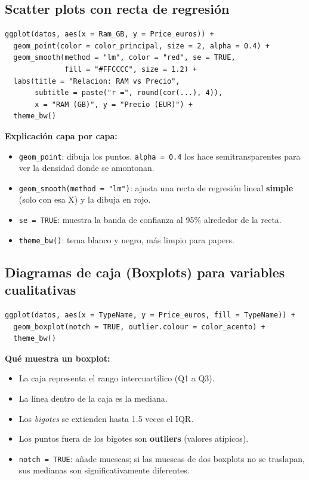 \documentclass[12pt,a4paper]{article}
\begin{document}
\subsection{Scatter plots con recta de regresión}

\begin{lstlisting}[caption={Scatter plot RAM vs Precio}]
ggplot(datos, aes(x = Ram_GB, y = Price_euros)) +
  geom_point(color = color_principal, size = 2, alpha = 0.4) +
  geom_smooth(method = "lm", color = "red", se = TRUE, 
              fill = "#FFCCCC", size = 1.2) +
  labs(title = "Relacion: RAM vs Precio",
       subtitle = paste("r =", round(cor(...), 4)),
       x = "RAM (GB)", y = "Precio (EUR)") +
  theme_bw()
\end{lstlisting}

\textbf{Explicación capa por capa:}
\begin{itemize}
    \item \texttt{geom\_point}: dibuja los puntos. \texttt{alpha = 0.4} los hace semitransparentes para ver la densidad donde se amontonan.
    \item \texttt{geom\_smooth(method = "lm")}: ajusta una recta de regresión lineal \textbf{simple} (solo con esa X) y la dibuja en rojo.
    \item \texttt{se = TRUE}: muestra la banda de confianza al 95\% alrededor de la recta.
    \item \texttt{theme\_bw()}: tema blanco y negro, más limpio para papers.
\end{itemize}

\subsection{Diagramas de caja (Boxplots) para variables cualitativas}

\begin{lstlisting}[caption={Boxplot Tipo de Laptop vs Precio}]
ggplot(datos, aes(x = TypeName, y = Price_euros, fill = TypeName)) +
  geom_boxplot(notch = TRUE, outlier.colour = color_acento) +
  theme_bw()
\end{lstlisting}

\textbf{Qué muestra un boxplot:}
\begin{itemize}
    \item La caja representa el rango intercuartílico (Q1 a Q3).
    \item La línea dentro de la caja es la mediana.
    \item Los \textit{bigotes} se extienden hasta 1.5 veces el IQR.
    \item Los puntos fuera de los bigotes son \textbf{outliers} (valores atípicos).
    \item \texttt{notch = TRUE}: añade muescas; si las muescas de dos boxplots no se traslapan, sus medianas son significativamente diferentes.
\end{itemize}
\end{document}
